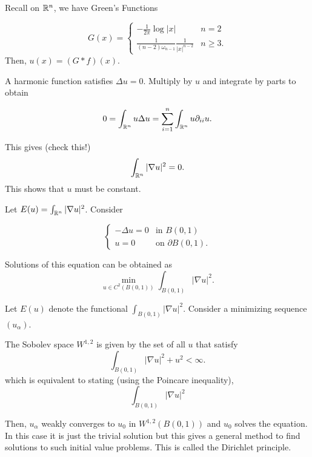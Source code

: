 Recall on $\mathbb{R}^n$, we have Green's Functions

\begin{equation*}
    G(x) = 
    \begin{cases}
        -\frac{1}{2\pi}\log|x| & n = 2\\
        \frac{1}{(n - 2)\omega_{n - 1}}\frac{1}{|x|^{n - 2}} & n\ge 3.
    \end{cases}
\end{equation*}
Then, $u(x) = (G\ast f)(x)$.

A harmonic function satisfies $\Delta u = 0$. Multiply by $u$ and integrate by parts to obtain 

\begin{equation*}
    0 = \int_{\mathbb{R}^n} u\Delta u = \sum_{i = 1}^n\int_{\mathbb{R}^n}u\partial_{ii}u.
\end{equation*}

This gives (check this!)
\begin{equation*}
    \int_{\mathbb{R}^n} |\nabla u|^2 = 0.
\end{equation*}
This shows that $u$ must be constant.

Let $E(u) = \int_{\mathbb{R}^n}|\nabla u|^2$. Consider 

\begin{equation*}
    \begin{cases}
        -\Delta u = 0 & \text{in } B(0, 1)\\
        u = 0 & \text{on }\partial B(0, 1).
    \end{cases}
\end{equation*}

Solutions of this equation can be obtained as 
\begin{equation*}
    \min_{u\in C^2(B(0, 1))}\int_{B(0, 1)}|\nabla u|^2.
\end{equation*}

Let $E(u)$ denote the functional $\int_{B(0, 1)}|\nabla u|^2$. Consider a minimizing sequence $(u_\alpha)$.

The Sobolev space $W^{1,2}$ is given by the set of all $u$ that satisfy 
\begin{equation*}
    \int_{B(0,1)}|\nabla u|^2 + u^2 < \infty.
\end{equation*}
which is equivalent to stating (using the Poincare inequality),
\begin{equation*}
    \int_{B(0,1)}|\nabla u|^2
\end{equation*}

Then, $u_\alpha$ weakly converges to $u_0$ in $W^{1,2}(B(0, 1))$ and $u_0$ solves the equation. In this case it is just the trivial solution but this gives a general method to find solutions to such initial value problems. This is called the Dirichlet principle.

